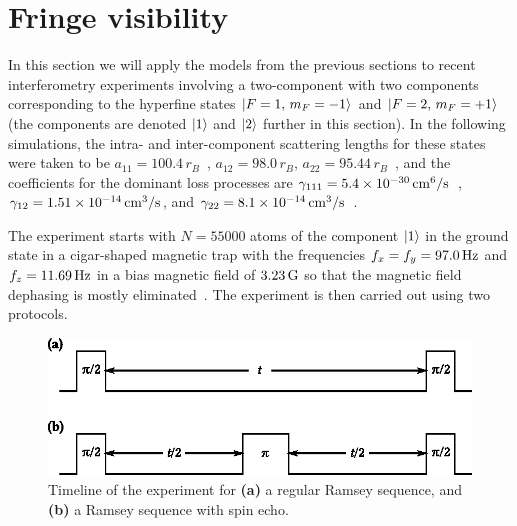 \section{Fringe visibility}
\label{sec:bec-noise:visibility}

In this section we will apply the models from the previous sections to recent interferometry experiments involving a two-component \Rb{}  with two components corresponding to the hyperfine states ${\mbox{\ensuremath{\left\vert F=1,\, m_F=-1 \right\rangle}}}$ and ${\mbox{\ensuremath{\left\vert F=2,\, m_F=+1 \right\rangle}}}$~\cite{Egorov2011} (the components are denoted $\mbox{\ensuremath{\left\vert 1 \right\rangle}}$ and $\mbox{\ensuremath{\left\vert 2 \right\rangle}}$ further in this section).
In the following simulations, the intra- and inter-component scattering lengths for these states were taken to be $a_{11} = 100.4\,r_B$~\cite{Widera2006,Mertes2007}, $a_{12} = 98.0\,r_B$, $a_{22} = 95.44\,r_B$~\cite{Egorov2013}, and the coefficients for the dominant loss processes are $\gamma_{111} = 5.4 \times 10^{-30} \mbox{\ensuremath{\,\mathrm{cm^6/s}}}$~\cite{Mertes2007}, $\gamma_{12} = 1.51 \times 10^{-14}\mbox{\ensuremath{\,\mathrm{cm^3/s}}}$, and $\gamma_{22} = 8.1 \times 10^{-14} \mbox{\ensuremath{\,\mathrm{cm^3/s}}}$~\cite{Egorov2013}.

The experiment starts with $N = 55000$ atoms of the component $\mbox{\ensuremath{\left\vert 1 \right\rangle}}$ in the ground state in a cigar-shaped magnetic trap with the frequencies $f_x = f_y = 97.0\mbox{\ensuremath{\,\mathrm{Hz}}}$ and $f_z = 11.69\mbox{\ensuremath{\,\mathrm{Hz}}}$ in a bias magnetic field of $3.23\mbox{\ensuremath{\,\mathrm{G}}}$ so that the magnetic field dephasing is mostly eliminated~\cite{Hall1998}.
The experiment is then carried out using two protocols.

\begin{figure}
    \centerline{\includegraphics{figures_precreated/sequences.eps}}
    \caption[Timeline of Ramsey and spin echo experimental sequences]{
    Timeline of the experiment for \textbf{(a)} a regular Ramsey sequence, and \textbf{(b)} a Ramsey sequence with spin echo.}%
    \label{fig:bec-noise:visibility:sequences}
\end{figure}

